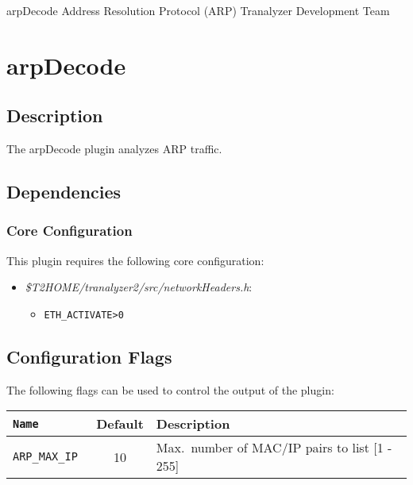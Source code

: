\documentclass[documentation]{subfiles}
\begin{document}
\trantitle
    {arpDecode}
    {Address Resolution Protocol (ARP)}
    {Tranalyzer Development Team} %

\section{arpDecode}\label{s:arpDecode}

\subsection{Description}
The arpDecode plugin analyzes ARP traffic.

\subsection{Dependencies}

\subsubsection{Core Configuration}
This plugin requires the following core configuration:
\begin{itemize}
    \item {\em \$T2HOME/tranalyzer2/src/networkHeaders.h}:
        \begin{itemize}
            \item {\tt ETH\_ACTIVATE>0}
        \end{itemize}
\end{itemize}

\subsection{Configuration Flags}
The following flags can be used to control the output of the plugin:
\begin{longtable}{>{\tt}lcl}
    \toprule
    {\bf Name} & {\bf Default} & {\bf Description}\\
    \midrule\endhead%
    ARP\_MAX\_IP & 10 & Max.\ number of MAC/IP pairs to list [1 - 255]\\
    \bottomrule
\end{longtable}
\end{document}
